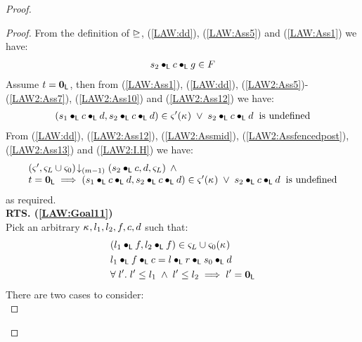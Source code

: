 \begin{lemma}[]
\begin{proof}
\begin{proof}
From the definition of $\unrhd$, (\ref{LAW:dd}), (\ref{LAW:Ass5}) and (\ref{LAW:Ass1}) we have:
%
\begin{align}
	s_2 \bullet_{\textsf{L}} c \bullet_{\textsf{L}} g \in F \label{LAW2:Assfencedpost}
\end{align}
Assume $t = \mathbf{0}_{\textsf{L}}$, then from (\ref{LAW:Ass1}), (\ref{LAW:dd}), (\ref{LAW2:Ass5})-(\ref{LAW2:Ass7}), (\ref{LAW2:Ass10}) and (\ref{LAW2:Ass12}) we have:
%
\begin{align}
	(s_1 \bullet_{\textsf{L}} c \bullet_{\textsf{L}} d, s_2 \bullet_{\textsf{L}} c \bullet_{\textsf{L}} d) \in \varsigma_{}'(\kappa_{}) \;\lor\; s_2 \bullet_{\textsf{L}} c \bullet_{\textsf{L}} d \hspace*{0.2cm} \text{is undefined} \label{LAW2:Ass13}
\end{align}
%
%
From (\ref{LAW:dd}), (\ref{LAW2:Ass12}), (\ref{LAW2:Assmid}), (\ref{LAW2:Assfencedpost}), (\ref{LAW2:Ass13}) and (\ref{LAW2:I.H}) we have:
%
%
\begin{align}
\begin{array}{l}
	\left(\varsigma_{}', \varsigma_{L} \cup \varsigma_{0}\right) \!\downarrow_{(m-1)} \left(s_2 \bullet_{\textsf{L}} c, d, \varsigma_{L}\right) \;\land \\
	t = \mathbf{0}_{\textsf{L}} \implies (s_1 \bullet_{\textsf{L}} c \bullet_{\textsf{L}} d, s_2 \bullet_{\textsf{L}} c \bullet_{\textsf{L}} d) \in \varsigma_{}'(\kappa_{}) \;\lor\; s_2 \bullet_{\textsf{L}} c \bullet_{\textsf{L}} d \hspace*{0.2cm} \text{is undefined}
\end{array} \nonumber
\end{align}
%
as required.\\

\noindent\textbf{RTS. (\ref{LAW:Goal11})}\\
Pick an arbitrary $\kappa_{}, l_1, l_2, f, c, d$ such that:
%
\begin{align}
	& (l_1 \bullet_{\textsf{L}} f, l_2 \bullet_{\textsf{L}} f) \in \varsigma_{L} \cup \varsigma_{0}(\kappa_{}) \label{LAW2:Ass16}\\
	& l_1 \bullet_{\textsf{L}} f \bullet_{\textsf{L}} c = l \bullet_{\textsf{L}} r \bullet_{\textsf{L}} s_0 \bullet_{\textsf{L}} d \label{LAW2:Ass17}\\
	& \forall\; l'.\; l' \leq l_1 \;\land\; l' \leq l_2 \implies l' = \mathbf{0}_{\textsf{L}} \label{LAW2:Ass18}
\end{align}
%
There are two cases to consider:\\


\end{proof}
\end{proof}
\end{lemma}
